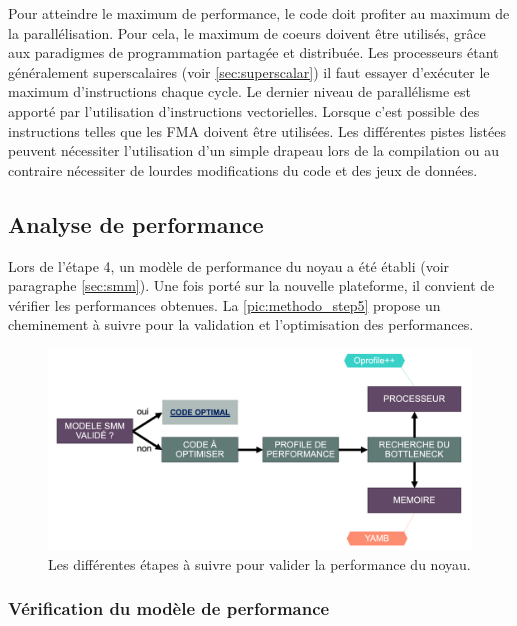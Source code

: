         Pour atteindre le maximum de performance, le code doit profiter au maximum de la parallélisation. Pour cela, le maximum de coeurs doivent être utilisés, grâce aux paradigmes de programmation partagée et distribuée. Les processeurs étant généralement superscalaires (voir \autoref{sec:superscalar}) il faut essayer d'exécuter le maximum d'instructions chaque cycle. Le dernier niveau de parallélisme est apporté par l'utilisation d'instructions vectorielles. Lorsque c'est possible des instructions telles que les \gls{FMA} doivent être utilisées. Les différentes pistes listées peuvent nécessiter l'utilisation d'un simple drapeau lors de la compilation ou au contraire nécessiter de lourdes modifications du code et des jeux de données.
    

\subsection{Analyse de performance}

    Lors de l'étape 4, un modèle de performance du noyau a été établi (voir paragraphe \ref{sec:smm}). Une fois porté sur la nouvelle plateforme, il convient de vérifier les performances obtenues. La \autoref{pic:methodo_step5} propose un cheminement à suivre pour la validation et l'optimisation des performances.

\begin{figure}[h!]
    \center
    \includegraphics[width=14cm]{images/methodo_step5.png}
    \caption{\label{pic:methodo_step5}Les différentes étapes à suivre pour valider la performance du noyau.}
\end{figure}




    \subsubsection{Vérification du modèle de performance}
    

